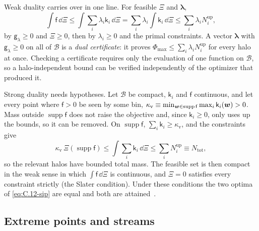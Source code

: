 Weak duality carries over in one line. For feasible $\Xi$ and $\boldsymbol{\lambda}$,
\begin{equation}
  \int\mathsf{f}\,\dd\Xi \le \int\sum_i\lambda_i\mathsf{k}_i\,\dd\Xi = \sum_i\lambda_i\int\mathsf{k}_i\,\dd\Xi \le \sum_i\lambda_iN_i^{\mathrm{up}} ,
  \label{eq:C.12-certificate}
\end{equation}
by $\mathsf{g}_\lambda \ge 0$ and $\Xi \ge 0$, then by $\lambda_i \ge 0$ and the primal constraints. A vector $\boldsymbol{\lambda}$ with $\mathsf{g}_\lambda \ge 0$ on all of $\mathcal{B}$ is a \emph{dual certificate}: it proves $\Phi_{\max} \le \sum_i\lambda_iN_i^{\mathrm{up}}$ for every halo at once. Checking a certificate requires only the evaluation of one function on $\mathcal{B}$, so a halo-independent bound can be verified independently of the optimizer that produced it.

Strong duality needs hypotheses. Let $\mathcal{B}$ be compact, $\mathsf{k}_i$ and $\mathsf{f}$ continuous, and let every point where $\mathsf{f} > 0$ be seen by some bin, $\kappa_{\mathrm{v}} \equiv \min_{\bm{w} \in \operatorname{supp}\mathsf{f}}\max_i\mathsf{k}_i(\bm{w}) > 0$. Mass outside $\operatorname{supp}\mathsf{f}$ does not raise the objective and, since $\mathsf{k}_i \ge 0$, only uses up the bounds, so it can be removed. On $\operatorname{supp}\mathsf{f}$, $\sum_i\mathsf{k}_i \ge \kappa_{\mathrm{v}}$, and the constraints give
\begin{equation}
  \kappa_{\mathrm{v}}\,\Xi(\operatorname{supp}\mathsf{f}) \le \int\sum_i\mathsf{k}_i\,\dd\Xi \le \sum_iN_i^{\mathrm{up}} \equiv N_{\mathrm{tot}} ,
  \label{eq:C.12-mass}
\end{equation}
so the relevant halos have bounded total mass. The feasible set is then compact in the weak sense in which $\int\mathsf{f}\,\dd\Xi$ is continuous, and $\Xi = 0$ satisfies every constraint strictly (the Slater condition). Under these conditions the two optima of \cref{eq:C.12-sip} are equal and both are attained~\cite{shapiro2009semi}.

\subsection{Extreme points and streams}

